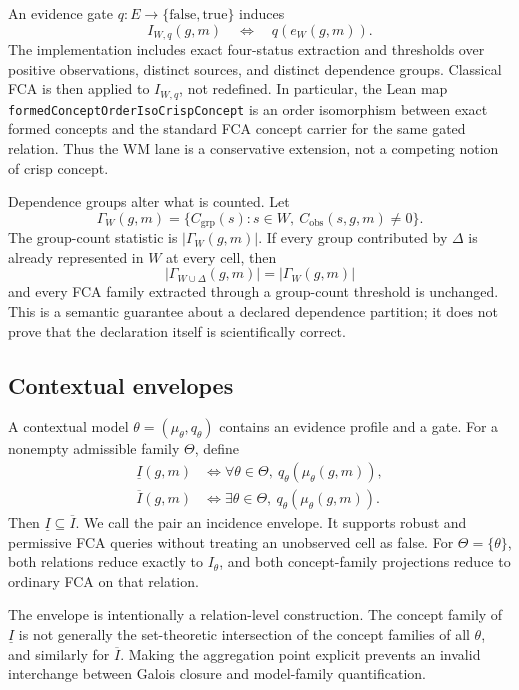 \documentclass[11pt]{article}
\newcommand{\code}[1]{\nolinkurl{#1}}
\newcommand{\lowerrel}{\underline{I}}
\newcommand{\upperrel}{\overline{I}}
\begin{document}
An evidence gate $q:E\to\{\mathrm{false},\mathrm{true}\}$ induces
\[
  I_{W,q}(g,m)\quad\Longleftrightarrow\quad q(e_W(g,m)).
\]
The implementation includes exact four-status extraction and thresholds over
positive observations, distinct sources, and distinct dependence groups.
Classical FCA is then applied to $I_{W,q}$, not redefined. In particular, the
Lean map \code{formedConceptOrderIsoCrispConcept} is an order isomorphism
between exact formed concepts and the standard FCA concept carrier for the
same gated relation. Thus the WM lane is a conservative extension, not a
competing notion of crisp concept.

Dependence groups alter what is counted. Let
\[
  \Gamma_W(g,m)=
  \{C_{\mathrm{grp}}(s):s\in W,\ C_{\mathrm{obs}}(s,g,m)\neq0\}.
\]
The group-count statistic is $|\Gamma_W(g,m)|$. If every group contributed by
$\Delta$ is already represented in $W$ at every cell, then
\[
  |\Gamma_{W\cup\Delta}(g,m)|=|\Gamma_W(g,m)|
\]
and every FCA family extracted through a group-count threshold is unchanged.
This is a semantic guarantee about a declared dependence partition; it does
not prove that the declaration itself is scientifically correct.

\subsection{Contextual envelopes}

A contextual model $\theta=(\mu_\theta,q_\theta)$ contains an evidence profile
and a gate. For a nonempty admissible family $\Theta$, define
\[
\begin{aligned}
  \lowerrel(g,m)
    &\Longleftrightarrow \forall\theta\in\Theta,\
      q_\theta(\mu_\theta(g,m)),\\
  \upperrel(g,m)
    &\Longleftrightarrow \exists\theta\in\Theta,\
      q_\theta(\mu_\theta(g,m)).
\end{aligned}
\]
Then $\lowerrel\subseteq\upperrel$. We call the pair an incidence envelope.
It supports robust and permissive FCA queries without treating an unobserved
cell as false. For $\Theta=\{\theta\}$, both relations reduce exactly to
$I_\theta$, and both concept-family projections reduce to ordinary FCA on that
relation.

The envelope is intentionally a relation-level construction. The concept
family of $\lowerrel$ is not generally the set-theoretic intersection of the
concept families of all $\theta$, and similarly for $\upperrel$. Making the
aggregation point explicit prevents an invalid interchange between Galois
closure and model-family quantification.
\end{document}
